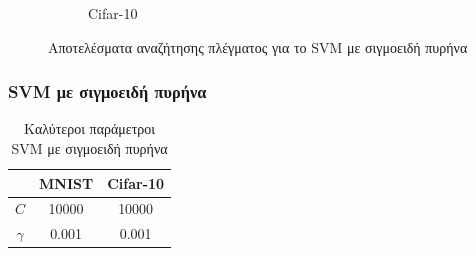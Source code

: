 \documentclass{beamer}
\begin{document}
\begin{frame}
\begin{figure}[H]
\begin{subfigure}[t]{0.45\linewidth}
    \caption{Cifar-10}
    \end{subfigure}

    \caption{Αποτελέσματα αναζήτησης πλέγματος για το SVM με σιγμοειδή πυρήνα}
    \label{fig:cv_sigmoid}
\end{figure}

\end{frame}

\begin{frame}
\frametitle{SVM με σιγμοειδή πυρήνα}

\begin{table}[h]
\centering
\begin{tabular}{|c|c|c|}
\hline
         & MNIST & Cifar-10 \\ \hline
$C$      & 10000 & 10000    \\ \hline
$\gamma$ & 0.001 & 0.001    \\ \hline
\end{tabular}
\caption{Καλύτεροι παράμετροι SVM με σιγμοειδή πυρήνα}
\label{tab:best_sigmoid}
\end{table}

\end{frame}
\end{document}
